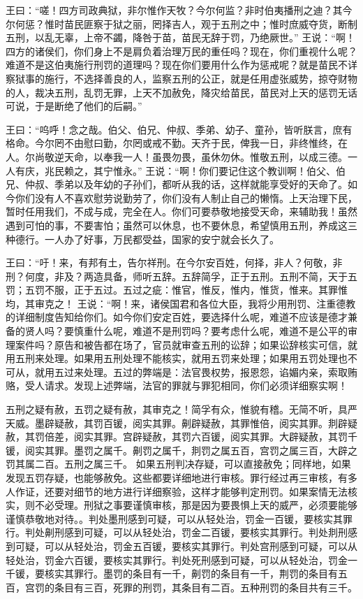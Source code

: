 \documentclass[12pt,UTF8]{ctexbook}
\begin{document}
王曰：“嗟！四方司政典狱，非尔惟作天牧？今尔何监？非时伯夷播刑之迪？其今尔何惩？惟时苗民匪察于狱之丽，罔择吉人，观于五刑之中；惟时庶威夺货，断制五刑，以乱无辜，上帝不蠲，降咎于苗，苗民无辞于罚，乃绝厥世。”
王说：“啊！四方的诸侯们，你们身上不是肩负着治理万民的重任吗？现在，你们重视什么呢？难道不是这伯夷施行刑罚的道理吗？现在你们要用什么作为惩戒呢？就是苗民不详察狱事的施行，不选择善良的人，监察五刑的公正，就是任用虚张威势，掠夺财物的人，裁决五刑，乱罚无罪，上天不加赦免，降灾给苗民，苗民对上天的惩罚无话可说，于是断绝了他们的后嗣。”

王曰：“呜呼！念之哉。伯父、伯兄、仲叔、季弟、幼子、童孙，皆听朕言，庶有格命。今尔罔不由慰曰勤，尔罔或戒不勤。天齐于民，俾我一日，非终惟终，在人。尔尚敬逆天命，以奉我一人！虽畏勿畏，虽休勿休。惟敬五刑，以成三德。一人有庆，兆民赖之，其宁惟永。”
王说：“啊！你们要记住这个教训啊！伯父、伯兄、仲叔、季弟以及年幼的子孙们，都听从我的话，这样就能享受好的天命了。如今你们没有人不喜欢慰劳说勤劳了，你们没有人制止自己的懒惰。上天治理下民，暂时任用我们，不成与成，完全在人。你们可要恭敬地接受天命，来辅助我！虽然遇到可怕的事，不要害怕；虽然可以休息，也不要休息，希望慎用五刑，养成这三种德行。一人办了好事，万民都受益，国家的安宁就会长久了。

王曰：“吁！来，有邦有土，告尔祥刑。在今尔安百姓，何择，非人？何敬，非刑？何度，非及？两造具备，师听五辞。五辞简孚，正于五刑。五刑不简，天于五罚；五罚不服，正于五过。五过之疵：惟官，惟反，惟内，惟货，惟来。其罪惟均，其审克之！
王说：“啊！来，诸侯国君和各位大臣，我将少用刑罚、注重德教的详细制度告知给你们。如今你们安定百姓，要选择什么呢，难道不应该是德才兼备的贤人吗？要慎重什么呢，难道不是刑罚吗？要考虑什么呢，难道不是公平的审理案件吗？原告和被告都在场了，官员就审查五刑的讼辞；如果讼辞核实可信，就用五刑来处理。如果用五刑处理不能核实，就用五罚来处理；如果用五罚处理也不可从，就用五过来处理。五过的弊端是：法官畏权势，报恩怨，谄媚内亲，索取贿赂，受人请求。发现上述弊端，法官的罪就与罪犯相同，你们必须详细察实啊！

五刑之疑有赦，五罚之疑有赦，其审克之！简孚有众，惟貌有稽。无简不听，具严天威。墨辟疑赦，其罚百锾，阅实其罪。劓辟疑赦，其罪惟倍，阅实其罪。剕辟疑赦，其罚倍差，阅实其罪。宫辟疑赦，其罚六百锾，阅实其罪。大辟疑赦，其罚千锾，阅实其罪。墨罚之属千。劓罚之属千，剕罚之属五百，宫罚之属三百，大辟之罚其属二百。五刑之属三千。
如果五刑判决存疑，可以直接赦免；同样地，如果发现五罚存疑，也能够赦免。这些都要详细地进行审核。罪行经过再三审核，有多人作证，还要对细节的地方进行详细察验，这样才能够判定刑罚。如果案情无法核实，则不必受理。刑狱之事要谨慎审核，那是因为要畏惧上天的威严，必须要能够谨慎恭敬地对待。。判处墨刑感到可疑，可以从轻处治，罚金一百锾，要核实其罪行。判处劓刑感到可疑，可以从轻处治，罚金二百锾，要核实其罪行。判处剕刑感到可疑，可以从轻处治，罚金五百锾，要核实其罪行。判处宫刑感到可疑，可以从轻处治，罚金六百锾，要核实其罪行。判处死刑感到可疑，可以从轻处治，罚金一千锾，要核实其罪行。墨罚的条目有一千，劓罚的条目有一千，荆罚的条目有五百，宫罚的条目有三百，死罪的刑罚，其条目有二百。五种刑罚的条目共有三千。
\end{document}
